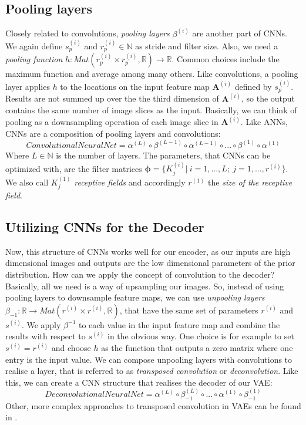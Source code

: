 \documentclass[12pt]{report}
\theoremstyle{definition}
\begin{document}
\subsection{Pooling layers}
Closely related to convolutions, \emph{pooling layers} $\beta^{(i)}$ are another part of CNNs. We again define $s_p^{(i)}$ and $r_p^{(i)}\in \mathbb{N}$ as stride and filter size. Also, we need a \emph{pooling function} $h: Mat(r_p^{(i)} \times r_p^{(i)}, \mathbb{R}) \rightarrow \mathbb{R}$. Common choices include the maximum function and average among many others. Like convolutions, a pooling layer applies $h$ to the locations on the input feature map $\mathbf{A}^{(i)}$ defined by $s_p^{(i)}$. Results are not summed up over the the third dimension of $\mathbf{A}^{(i)}$, so the output contains the same number of image slices as the input. Basically, we can think of pooling as a downsampling operation of each image slice in $\mathbf{A}^{(i)}$.
Like ANNs, CNNs are a composition of pooling layers and convolutions:
\begin{equation}
ConvolutionalNeuralNet = \alpha^{(L)} \circ \beta^{(L-1)} \circ \alpha^{(L-1)} \circ ... \circ \beta^{(1)} \circ \alpha^{(1)}
\end{equation}
Where $L \in \mathbb{N}$ is the number of layers. The parameters, that CNNs can be optimized with, are the filter matrices $\pmb{\phi} = \{ K^{(i)}_j | \ i=1, ..., L; \ j=1, ..., r^{(i)} \}$. We also call $K^{(1)}_j$ \emph{receptive fields} and accordingly $r^{(1)}$ the \emph{size of the receptive field}.

\subsection{Utilizing CNNs for the Decoder}
Now, this structure of CNNs works well for our encoder, as our inputs are high dimensional images and outputs are the low dimensional parameters of the prior distribution. How can we apply the concept of convolution to the decoder?
Basically, all we need is a way of upsampling our images. So, instead of using pooling layers to downsample feature maps, we can use \emph{unpooling layers} $\beta_{-1}: \mathbb{R} \rightarrow Mat(r^{(i)} \times r^{(i)}, \mathbb{R})$, that have the same set of parameters $r^{(i)}$ and $s^{(i)}$. We apply $\beta^{-1}$ to each value in the input feature map and combine the results with respect to $s^{(i)}$ in the obvious way. One choice is for example to set $s^{(i)} = r^{(i)}$ and choose $h$ as the function that outputs a zero matrix where one entry is the input value. We can compose unpooling layers with convolutions to realise a layer, that is referred to as \emph{transposed convolution} or \emph{deconvolution}. Like this, we can create a CNN structure that realises the decoder of our VAE:
\begin{equation}
DeconvolutionalNeuralNet = \alpha^{(L)} \circ \beta^{(L)}_{-1} \circ ... \circ \alpha^{(1)} \circ \beta_{-1}^{(1)}
\end{equation}
Other, more complex approaches to transposed convolution in VAEs can be found in \cite{cvae}.
\end{document}
